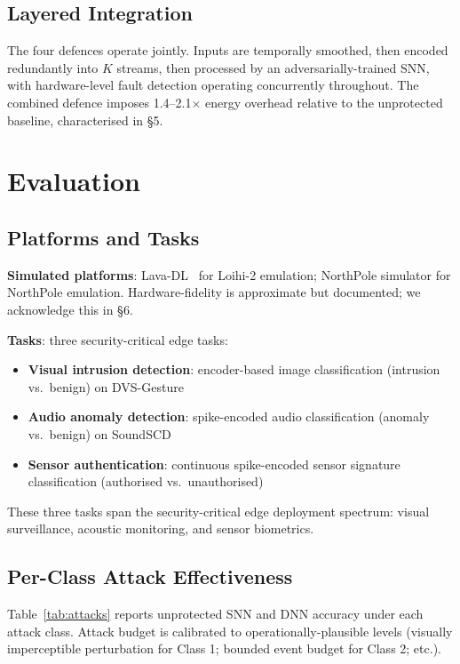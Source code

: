 \documentclass[sigconf,nonacm]{acmart}
\begin{document}
\subsection{Layered Integration}

The four defences operate jointly. Inputs are temporally smoothed,
then encoded redundantly into $K$ streams, then processed by an
adversarially-trained SNN, with hardware-level fault detection
operating concurrently throughout. The combined defence imposes
1.4--2.1$\times$ energy overhead relative to the unprotected
baseline, characterised in §5.

\section{Evaluation}

\subsection{Platforms and Tasks}

\textbf{Simulated platforms}: Lava-DL~\cite{intel2024lava} for
Loihi-2 emulation; NorthPole simulator for NorthPole emulation.
Hardware-fidelity is approximate but documented; we acknowledge
this in §6.

\textbf{Tasks}: three security-critical edge tasks:
\begin{itemize}
  \item \textbf{Visual intrusion detection}: encoder-based image
        classification (intrusion vs.\ benign) on
        DVS-Gesture~\cite{amir2017dvs}
  \item \textbf{Audio anomaly detection}: spike-encoded audio
        classification (anomaly vs.\ benign) on
        SoundSCD~\cite{salamon2014urban}
  \item \textbf{Sensor authentication}: continuous spike-encoded
        sensor signature classification (authorised vs.\
        unauthorised)
\end{itemize}

These three tasks span the security-critical edge deployment
spectrum: visual surveillance, acoustic monitoring, and sensor
biometrics.

\subsection{Per-Class Attack Effectiveness}

Table~\ref{tab:attacks} reports unprotected SNN and DNN accuracy
under each attack class. Attack budget is calibrated to
operationally-plausible levels (visually imperceptible
perturbation for Class 1; bounded event budget for Class 2; etc.).
\end{document}
